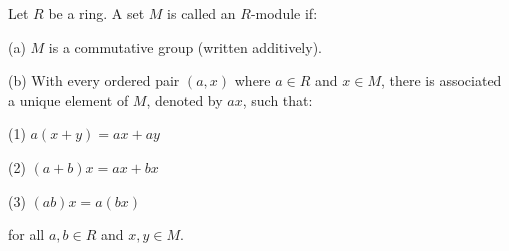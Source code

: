 Let $R$ be a ring. A set $M$ is called an $R$-module if:

(a) $M$ is a commutative group (written additively).

(b) With every ordered pair $(a, x)$ where $a \in R$ and $x \in M$, there is associated a unique element of $M$, denoted by $ax$, such that:

(1) $a(x + y) = ax + ay$

(2) $(a + b)x = ax + bx$

(3) $(ab)x = a(bx)$

for all $a, b \in R$ and $x, y \in M$.
